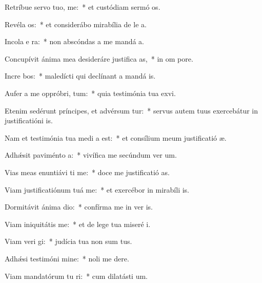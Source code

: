 \item Retríbue servo tuo,  me:~* et custódiam sermó os.
\item Revéla  os:~* et considerábo mirabília de le a.
\item Incola e   ra:~* non abscóndas a me mandá a.
\item Concupívit ánima mea desideráre justifica as,~* in om pore.
\item Incre bos:~* maledícti qui declínant a mandá is.
\item Aufer a me oppróbri,  tum:~* quia testimónia tua exvi.
\item Etenim sedérunt príncipes, et advérsum  tur:~* servus autem tuus exercebátur in justificatióni is.
\item Nam et testimónia tua medi a est:~* et consílium meum justificatió æ.
\item Adhǽsit paviménto  a:~* vivífica me secúndum ver um.
\item Vias meas enuntiávi  ti me:~* doce me justificatió as.
\item Viam justificatiónum tuá  me:~* et exercébor in mirabíli is.
\item Dormitávit ánima   dio:~* confírma me in ver is.
\item Viam iniquitátis   me:~* et de lege tua miseré i.
\item Viam veri gi:~* judícia tua non sum tus.
\item Adhǽsi testimóni  mine:~* noli me dere.
\item Viam mandatórum tu ri:~* cum dilatásti  um.
